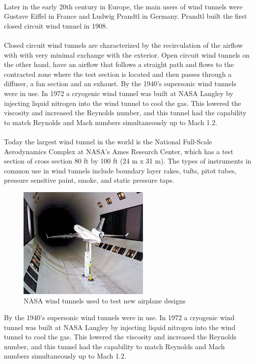 \paragraph{}
Later in the early 20th century in Europe, the main users of wind tunnels were Gustave Eiffel in France and Ludwig Prandtl in Germany. Prandtl built the first closed circuit wind tunnel in 1908.
\paragraph{}Closed circuit wind tunnels are characterized by the recirculation of the airflow with with very minimal exchange with the exterior. Open circuit wind tunnels on the other hand, have an airflow that follows a straight path and flows to the contracted zone where the test section is located and then passes through a diffuser, a fan section
and an exhaust.
\cite{fernandes_design_nodate}
By the 1940’s supersonic wind tunnels were in use. In 1972 a cryogenic wind tunnel was built at NASA Langley by injecting liquid nitrogen into the wind tunnel to cool the gas. This lowered the viscosity and increased the Reynolds number, and this tunnel had the capability to match Reynolds and Mach numbers simultaneously up to Mach 1.2. 
\paragraph{}Today the largest wind tunnel in the world is the National Full-Scale Aerodynamics Complex at NASA's Ames Research Center, which has a test section of cross section 80 ft by 100 ft (24 m x 31 m). The types of instruments in common use in wind tunnels include boundary layer rakes, tufts, pitot tubes, pressure sensitive paint, smoke, and static pressure taps.
\begin{center}
\begin{figure}[!h]
	\centering
	\includegraphics{Figures/Fig3}
	\caption{NASA wind tunnels used to test new airplane designs}
\end{figure}
\end{center}By the 1940’s supersonic wind tunnels were in use. In 1972 a cryogenic wind tunnel was built at NASA Langley by injecting liquid nitrogen into the wind tunnel to cool the gas. This lowered the viscosity and increased the Reynolds number, and this tunnel had the capability to match Reynolds and Mach numbers simultaneously up to Mach 1.2. 
